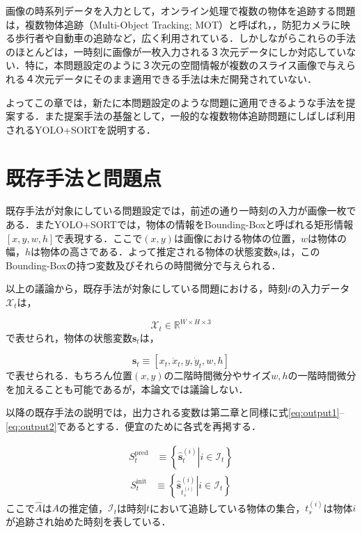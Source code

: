 \thispagestyle{fancy2}

画像の時系列データを入力として，オンライン処理で複数の物体を追跡する問題は，複数物体追跡（Multi-Object Tracking; MOT）と呼ばれ，\cite{luo2021multiple}，防犯カメラに映る歩行者や自動車の追跡など，広く利用されている．しかしながらこれらの手法のほとんどは，一時刻に画像が一枚入力される３次元データにしか対応していない．特に，本問題設定のように３次元の空間情報が複数のスライス画像で与えられる４次元データにそのまま適用できる手法は未だ開発されていない．
\par
よってこの章では，新たに本問題設定のような問題に適用できるような手法を提案する．また提案手法の基盤として，一般的な複数物体追跡問題にしばしば利用されるYOLO+SORT\cite{redmon2016you,alif2024yolov1,bewley2016simple}を説明する．

\section{既存手法と問題点}
既存手法が対象にしている問題設定では，前述の通り一時刻の入力が画像一枚である．またYOLO+SORTでは，物体の情報をBounding-Boxと呼ばれる矩形情報$\left[x, y, w, h\right]$で表現する．ここで$(x,y)$は画像における物体の位置，$w$は物体の幅，$h$は物体の高さである．よって推定される物体の状態変数$\bm{s}_t$は，このBounding-Boxの持つ変数及びそれらの時間微分で与えられる．
\par
以上の議論から，既存手法が対象にしている問題における，時刻$t$の入力データ$\mathcal{X}_t$は，

\begin{equation}
    \mathcal{X}_t \in \mathbb{R}^{W \times H \times 3}
\end{equation}
で表せられ，物体の状態変数$\bm{s}_t$は，

\begin{equation}
    \label{eq:sort_state}
    \bm{s}_t \equiv \left[x_t, \dot{x}_t, y, \dot{y}_t, w, h\right]
\end{equation}
で表せられる．もちろん位置$(x,y)$の二階時間微分やサイズ$w,h$の一階時間微分を加えることも可能であるが，本論文では議論しない．
\par
以降の既存手法の説明では，出力される変数は第二章と同様に式\ref{eq:output1}--\ref{eq:output2}であるとする．便宜のために各式を再掲する．

\begin{equation}
    \label{eq:output1on3}
    \begin{aligned}
        S^{\text{pred}}_t &\equiv \left\{ \left. \hat{\bm{s}}_t^{(i)}\right| i \in \mathcal{I}_t\right\}
    \end{aligned}
\end{equation}
\begin{equation}
    \label{eq:output2on3}
    \begin{aligned}
        S^{\text{init}}_t &\equiv \left\{ \left. \hat{\bm{s}}_{t_s^{(i)}}^{(i)}\right| i \in \mathcal{I}_t\right\}
    \end{aligned}
\end{equation}
ここで$\hat{A}$は$A$の推定値，$\mathcal{I}_t$は時刻$t$において追跡している物体の集合，$t_s^{(i)}$は物体$i$が追跡され始めた時刻を表している．

